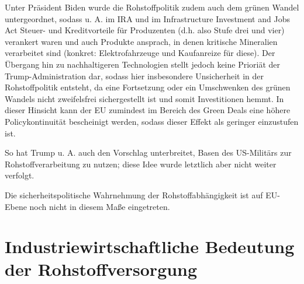 \documentclass[12pt,a4paper,oneside]{book} %
\begin{document}



Unter Präsident Biden wurde die Rohstoffpolitik zudem auch dem grünen Wandel untergeordnet, sodass u. A. im IRA und im Infrastructure Investment and Jobs Act Steuer- und Kreditvorteile für Produzenten (d.h. also Stufe drei und vier) verankert waren und auch Produkte ansprach, in denen kritische Mineralien verarbeitet sind (konkret: Elektrofahrzeuge und Kaufanreize für diese). Der Übergang hin zu nachhaltigeren Technologien stellt jedoch keine Prioriät der Trump-Administration dar, sodass hier insbesondere Unsicherheit in der Rohstoffpolitik entsteht, da eine Fortsetzung oder ein Umschwenken des grünen Wandels nicht zweifelsfrei sichergestellt ist und somit Investitionen hemmt. In dieser Hinsicht kann der EU zumindest im Bereich des Green Deals eine höhere Policykontinuität bescheinigt werden, sodass dieser Effekt als geringer einzustufen ist.



So hat Trump u. A. auch den Vorschlag unterbreitet, Basen des US-Militärs zur Rohstoffverarbeitung zu nutzen; diese Idee wurde letztlich aber nicht weiter verfolgt.

Die sicherheitspolitische Wahrnehmung der Rohstoffabhängigkeit ist auf EU-Ebene noch nicht in diesem Maße eingetreten.


\section{Industriewirtschaftliche Bedeutung der Rohstoffversorgung}
\end{document}
